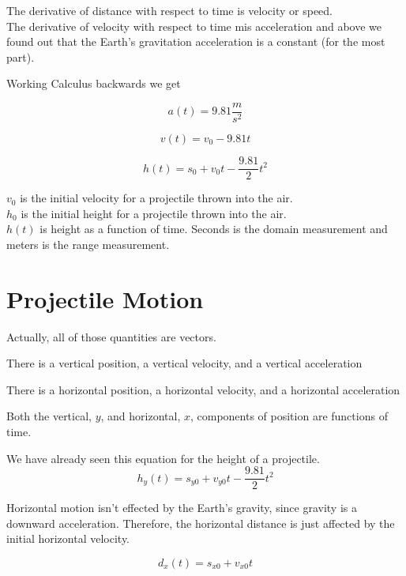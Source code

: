 \documentclass{ximera}
\begin{document}
The derivative of distance with respect to time is velocity or speed. \\

The derivative of velocity with respect to time mis acceleration and above we found out that the Earth's gravitation acceleration is a constant (for the most part).


Working Calculus backwards we get


\[ a(t) = 9.81 \frac{m}{s^2}  \]


\[ v(t) = v_0 - 9.81 t  \]


\[ h(t) = s_0 + v_0 t - \frac{9.81}{2} t^2  \]



$v_0$ is the initial velocity for a projectile thrown into the air. \\

$h_0$ is the initial height for a projectile thrown into the air. \\

$h(t)$ is height as a function of time.  Seconds is the domain measurement and meters is the range measurement.




\section{Projectile Motion}


Actually, all of those quantities are vectors.  

\begin{example}
\item There is a vertical position, a vertical velocity, and a vertical acceleration
\item There is a horizontal position, a horizontal velocity, and a horizontal acceleration
\end{example}



Both the vertical, $y$, and horizontal, $x$, components of position are functions of time.

We have already seen this equation for the height of a projectile.
\[ h_y(t) = s_{y0} + v_{y0} t - \frac{9.81}{2} t^2  \]

Horizontal motion isn't effected by the Earth's gravity, since gravity is a downward acceleration. Therefore, the horizontal distance is just affected by the initial horizontal velocity.


\[ d_x(t) = s_{x0} + v_{x0} t  \]
\end{document}
